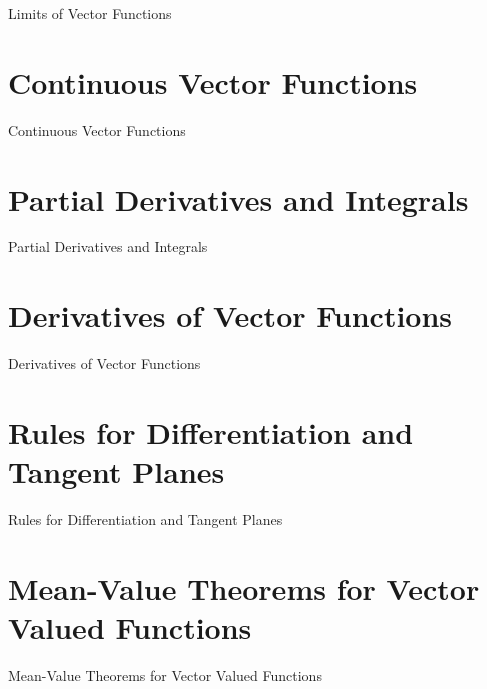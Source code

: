 Limits of Vector Functions

\section{Continuous Vector Functions}
\label{sec:continuous-vector-functions}

Continuous Vector Functions

\section{Partial Derivatives and Integrals}
\label{sec:partial-derivatives-and-integrals}

Partial Derivatives and Integrals

\section{Derivatives of Vector Functions}
\label{sec:derivatives-of-vector-functions}

Derivatives of Vector Functions

\section{Rules for Differentiation and Tangent Planes}
\label{sec:rules-for-differentiation-and-tangent-planes}

Rules for Differentiation and Tangent Planes

\section{Mean-Value Theorems for Vector Valued Functions}
\label{sec:mean-value-theorems-for-vector-valued-functions}

Mean-Value Theorems for Vector Valued Functions

